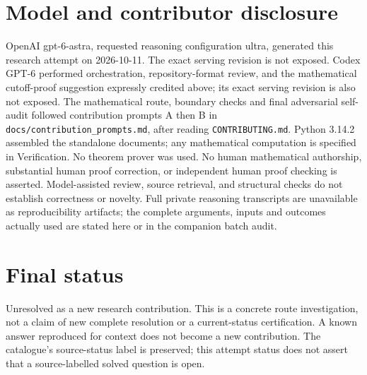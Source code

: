 \documentclass[11pt]{article}
\begin{document}
\section{Model and contributor disclosure}
OpenAI gpt-6-astra, requested reasoning configuration ultra, generated this research
attempt on 2026-10-11. The exact serving revision is not exposed. Codex GPT-6
performed orchestration, repository-format review, and the mathematical cutoff-proof suggestion expressly credited above; its exact serving revision
is also not exposed. The mathematical route, boundary checks and final adversarial
self-audit followed contribution prompts A then B in
\texttt{docs/contribution\_prompts.md}, after reading \texttt{CONTRIBUTING.md}.
Python 3.14.2 assembled the standalone documents; any mathematical computation is
specified in Verification. No theorem prover was used. No human mathematical
authorship, substantial human proof correction, or independent human proof checking
is asserted. Model-assisted review, source retrieval, and structural checks do not
establish correctness or novelty. Full private reasoning transcripts are unavailable
as reproducibility artifacts; the complete arguments, inputs and outcomes actually
used are stated here or in the companion batch audit.
\section{Final status}
Unresolved as a new research contribution. This is a concrete route investigation,
not a claim of new complete resolution or a current-status certification. A known
answer reproduced for context does not become a new contribution. The catalogue's
source-status label is preserved; this attempt status does not assert that a
source-labelled solved question is open.
\end{document}
